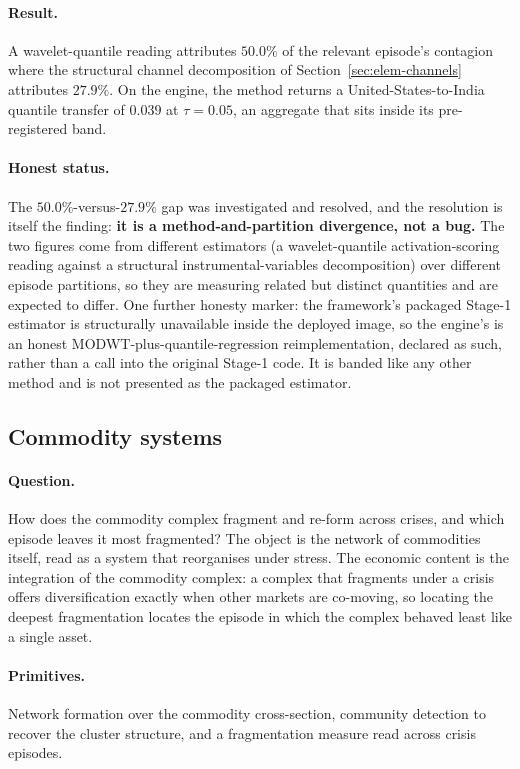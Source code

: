 \paragraph{Result.} A wavelet-quantile reading attributes $50.0\%$ of the
relevant episode's contagion where the structural channel decomposition of
Section~\ref{sec:elem-channels} attributes $27.9\%$. On the engine, the
 method returns a United-States-to-India quantile transfer of $0.039$
at $\tau=0.05$, an aggregate that sits inside its pre-registered band.

\paragraph{Honest status.} The $50.0\%$-versus-$27.9\%$ gap was investigated and
resolved, and the resolution is itself the finding: \textbf{it is a
method-and-partition divergence, not a bug.} The two figures come from different
estimators (a wavelet-quantile activation-scoring reading against a structural
instrumental-variables decomposition) over different episode partitions, so they
are measuring related but distinct quantities and are expected to differ. One
further honesty marker: the framework's packaged Stage-1 estimator is
structurally unavailable inside the deployed image, so the engine's 
is an honest MODWT-plus-quantile-regression reimplementation, declared as such,
rather than a call into the original Stage-1 code. It is banded like any other
method and is not presented as the packaged estimator.

\subsection{Commodity systems}
\label{sec:elem-commodity}

\paragraph{Question.} How does the commodity complex fragment and re-form across
crises, and which episode leaves it most fragmented? The object is the network of
commodities itself, read as a system that reorganises under stress. The economic
content is the integration of the commodity complex: a complex that fragments
under a crisis offers diversification exactly when other markets are
co-moving, so locating the deepest fragmentation locates the episode in which the
complex behaved least like a single asset.

\paragraph{Primitives.} Network formation over the commodity cross-section,
community detection to recover the cluster structure, and a fragmentation measure
read across crisis episodes.


